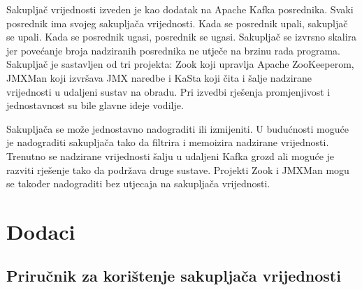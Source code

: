 \documentclass[utf8, diplomski, lmodern, numeric]{fer}
\begin{document}
Sakupljač vrijednosti izveden je kao dodatak na Apache Kafka posrednika. Svaki posrednik ima svojeg sakupljača vrijednosti. Kada se posrednik upali, sakupljač se upali. Kada se posrednik ugasi, posrednik se ugasi. Sakupljač se izvrsno skalira jer povećanje broja nadziranih posrednika ne utječe na brzinu rada programa. Sakupljač je sastavljen od tri projekta: Zook koji upravlja Apache ZooKeeperom, JMXMan koji izvršava JMX naredbe i KaSta koji čita i šalje nadzirane vrijednosti u udaljeni sustav na obradu. Pri izvedbi rješenja promjenjivost i jednostavnost su bile glavne ideje vodilje.

Sakupljača se može jednostavno nadograditi ili izmijeniti. U budućnosti moguće je nadograditi sakupljača tako da filtrira i memoizira nadzirane vrijednosti. Trenutno se nadzirane vrijednosti šalju u udaljeni Kafka grozd ali moguće je razviti rješenje tako da podržava druge sustave. Projekti Zook i JMXMan mogu se također nadograditi bez utjecaja na sakupljača vrijednosti.



\chapter{Dodaci}


\section{Priručnik za korištenje sakupljača vrijednosti}
\end{document}
